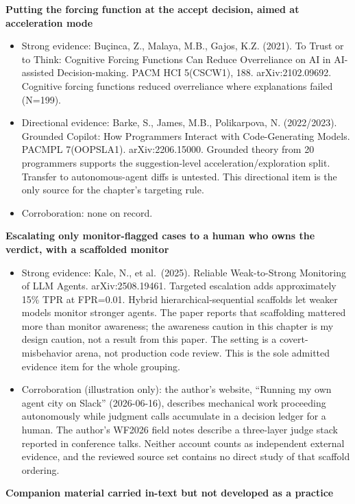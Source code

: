 \textbf{Putting the forcing function at the accept decision, aimed at acceleration mode}

\begin{itemize}
\tightlist
\item
  Strong evidence: Buçinca, Z., Malaya, M.B., Gajos, K.Z. (2021). To Trust or to Think: Cognitive Forcing Functions Can Reduce Overreliance on AI in AI-assisted Decision-making. PACM HCI 5(CSCW1), 188. arXiv:2102.09692. Cognitive forcing functions reduced overreliance where explanations failed (N=199).
\item
  Directional evidence: Barke, S., James, M.B., Polikarpova, N. (2022/2023). Grounded Copilot: How Programmers Interact with Code-Generating Models. PACMPL 7(OOPSLA1). arXiv:2206.15000. Grounded theory from 20 programmers supports the suggestion-level acceleration/exploration split. Transfer to autonomous-agent diffs is untested. This directional item is the only source for the chapter's targeting rule.
\item
  Corroboration: none on record.
\end{itemize}

\textbf{Escalating only monitor-flagged cases to a human who owns the verdict, with a scaffolded monitor}

\begin{itemize}
\tightlist
\item
  Strong evidence: Kale, N., et al.~(2025). Reliable Weak-to-Strong Monitoring of LLM Agents. arXiv:2508.19461. Targeted escalation adds approximately 15\% TPR at FPR=0.01. Hybrid hierarchical-sequential scaffolds let weaker models monitor stronger agents. The paper reports that scaffolding mattered more than monitor awareness; the awareness caution in this chapter is my design caution, not a result from this paper. The setting is a covert-misbehavior arena, not production code review. This is the sole admitted evidence item for the whole grouping.
\item
  Corroboration (illustration only): the author's website, ``Running my own agent city on Slack'' (2026-06-16), describes mechanical work proceeding autonomously while judgment calls accumulate in a decision ledger for a human. The author's WF2026 field notes describe a three-layer judge stack reported in conference talks. Neither account counts as independent external evidence, and the reviewed source set contains no direct study of that scaffold ordering.
\end{itemize}

\textbf{Companion material carried in-text but not developed as a practice}

